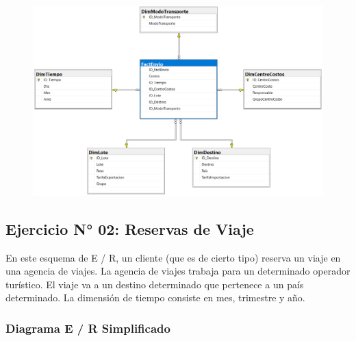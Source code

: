 \documentclass[12pt,letterpaper]{article}
\begin{document}
	\begin{figure}[htb]
		\begin{center}
			\includegraphics[width=15cm]{./Imagenes/Ejercicio1_DiagramaFisico}
			
		\end{center}
	\end{figure}

\newpage


\subsection{Ejercicio N° 02: Reservas de Viaje}

En este esquema de E / R, un cliente (que es de cierto tipo) reserva un viaje en una agencia de viajes. La agencia de viajes trabaja para un determinado operador turístico. El viaje va a un destino determinado que pertenece a un país determinado. La dimensión de tiempo consiste en mes, trimestre y año.



\subsubsection{\textbf{Diagrama E / R Simplificado}}
\end{document}
